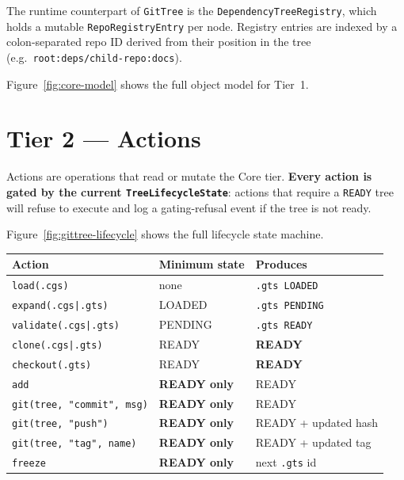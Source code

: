 The runtime counterpart of \texttt{GitTree} is the
\texttt{DependencyTreeRegistry}, which holds a mutable
\texttt{RepoRegistryEntry} per node.  Registry entries are indexed by a
colon-separated repo ID derived from their position in the tree (e.g.\
\texttt{root:deps/child-repo:docs}).

Figure~\ref{fig:core-model} shows the full object model for Tier~1.

\section{Tier 2 — Actions}
\label{sec:tier-actions}

Actions are operations that read or mutate the Core tier.  \textbf{Every
action is gated by the current \texttt{TreeLifecycleState}}: actions that
require a \texttt{READY} tree will refuse to execute and log a gating-refusal
event if the tree is not ready.

Figure~\ref{fig:gittree-lifecycle} shows the full lifecycle state machine.

\begin{center}
\begin{tabular}{lll}
\textbf{Action} & \textbf{Minimum state} & \textbf{Produces} \\
\hline
\texttt{load(.cgs)}                    & none        & \texttt{.gts LOADED} \\
\texttt{expand(.cgs|.gts)}             & LOADED      & \texttt{.gts PENDING} \\
\texttt{validate(.cgs|.gts)}           & PENDING     & \texttt{.gts READY} \\
\texttt{clone(.cgs|.gts)}              & READY       & \textbf{READY} \\
\texttt{checkout(.gts)}                & READY       & \textbf{READY} \\
\texttt{add}                           & \textbf{READY only} & READY \\
\texttt{git(tree, "commit", msg)}      & \textbf{READY only} & READY \\
\texttt{git(tree, "push")}             & \textbf{READY only} & READY + updated hash \\
\texttt{git(tree, "tag", name)}        & \textbf{READY only} & READY + updated tag \\
\texttt{freeze}                        & \textbf{READY only} & next \texttt{.gts} id \\
\hline
\end{tabular}
\end{center}

